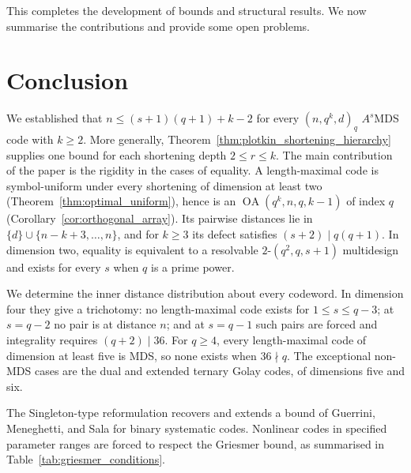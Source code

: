 \documentclass[12pt, letterpaper]{article}
\theoremstyle{plain}
\theoremstyle{definition}
\begin{document}
	This completes the development of bounds and structural results. We now summarise the contributions and provide some open problems.
	\section{Conclusion}
	\label{sec:conclusion}
	
	We established that $n \le (s+1)(q+1) + k - 2$ 	for every $(n,q^k,d)_q$ $A^s$MDS code with $k\ge2$. More generally, Theorem~\ref{thm:plotkin_shortening_hierarchy} supplies one bound for each shortening depth $2\le r\le k$. The main contribution of the paper is the rigidity in the cases of equality. A length-maximal code is symbol-uniform under every shortening of dimension at least two (Theorem~\ref{thm:optimal_uniform}), hence is an $\operatorname{OA}(q^k,n,q,k-1)$ of index $q$ (Corollary~\ref{cor:orthogonal_array}). Its pairwise distances lie in $\{d\}\cup\{n-k+3,\dots,n\}$, and for $k\ge3$ its defect satisfies $(s+2)\mid q(q+1)$. In dimension two, equality is equivalent to a resolvable $2$-$(q^2,q,s+1)$ multidesign and exists for every $s$ when $q$ is a prime power.

	We determine the inner distance distribution about every codeword. In dimension four they give a trichotomy: no length-maximal code exists for $1\le s\le q-3$; at $s=q-2$ no pair is at distance $n$; and at $s=q-1$ such pairs are forced and integrality requires $(q+2)\mid36$. For $q\ge4$, every length-maximal code of dimension at least five is MDS, so none exists when $36\nmid q$. The exceptional non-MDS cases are the dual and extended ternary Golay codes, of dimensions five and six. 
	
	The Singleton-type reformulation recovers and extends a bound of Guerrini, Meneghetti, and Sala for binary systematic codes. Nonlinear codes in specified parameter ranges are forced to respect the Griesmer bound, as summarised in Table~\ref{tab:griesmer_conditions}.
	
\end{document}
